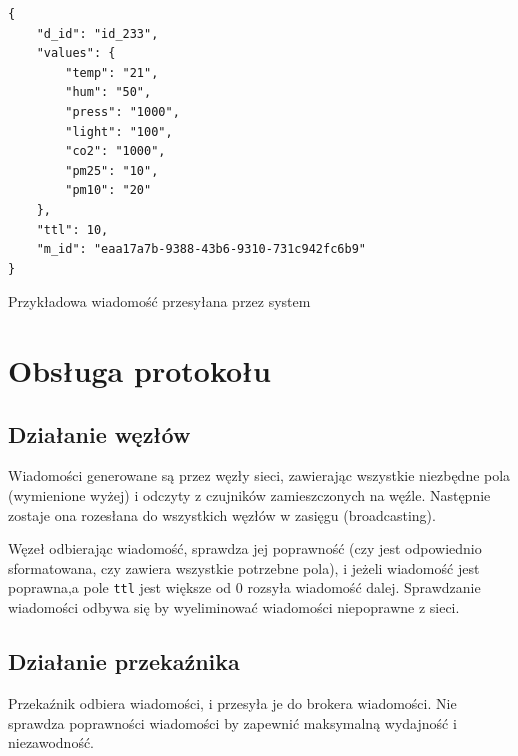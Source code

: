 \begin{lstfloat}[h!]
    \lstset{language=JavaScript}
    \begin{lstlisting}[frame=single]
{
    "d_id": "id_233",
    "values": {
        "temp": "21",
        "hum": "50",
        "press": "1000",
        "light": "100",
        "co2": "1000",
        "pm25": "10",
        "pm10": "20"
    },
    "ttl": 10,
    "m_id": "eaa17a7b-9388-43b6-9310-731c942fc6b9"
}          
\end{lstlisting}
    \caption{Przykładowa wiadomość przesyłana przez system}\label{lst:packet_format}
\end{lstfloat}

\section{Obsługa protokołu}

\subsection{Działanie węzłów}
Wiadomości generowane są przez węzły sieci, zawierając wszystkie niezbędne pola (wymienione wyżej) i odczyty z czujników zamieszczonych na węźle. Następnie zostaje ona rozesłana do wszystkich węzłów w zasięgu (broadcasting).

Węzeł odbierając wiadomość, sprawdza jej poprawność (czy jest odpowiednio sformatowana, czy zawiera wszystkie potrzebne pola), i jeżeli wiadomość jest poprawna,a pole \texttt{ttl} jest większe od 0 rozsyła wiadomość dalej.
Sprawdzanie wiadomości odbywa się by wyeliminować wiadomości niepoprawne z sieci.

\subsection{Działanie przekaźnika}
Przekaźnik odbiera wiadomości, i przesyła je do brokera wiadomości. Nie sprawdza poprawności wiadomości by zapewnić maksymalną wydajność i niezawodność.

